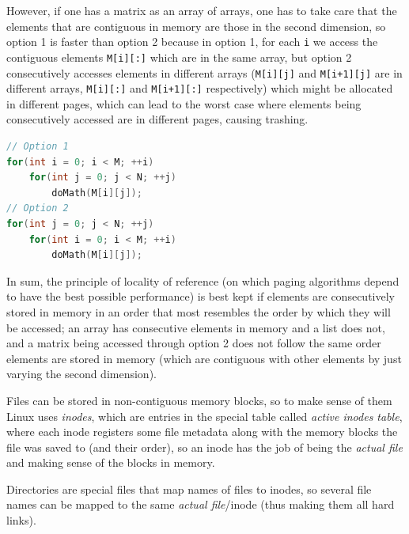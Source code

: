 \documentclass{sope}
\begin{document}
However, if one has a matrix as an array of arrays, one has to take care that the elements that are contiguous in memory are those in the second dimension, so option 1 is faster than option 2 because in option 1, for each \texttt{i} we access the contiguous elements \texttt{M[i][:]} which are in the same array, but option 2 consecutively accesses elements in different arrays (\texttt{M[i][j]} and \texttt{M[i+1][j]} are in different arrays, \texttt{M[i][:]} and \texttt{M[i+1][:]} respectively) which might be allocated in different pages, which can lead to the worst case where elements being consecutively accessed are in different pages, causing trashing.

\begin{lstlisting}[language=C]
// Option 1
for(int i = 0; i < M; ++i)
    for(int j = 0; j < N; ++j)
        doMath(M[i][j]);
// Option 2
for(int j = 0; j < N; ++j)
    for(int i = 0; i < M; ++i)
        doMath(M[i][j]);
\end{lstlisting}

In sum, the principle of locality of reference (on which paging algorithms depend to have the best possible performance) is best kept if elements are consecutively stored in memory in an order that most resembles the order by which they will be accessed; an array has consecutive elements in memory and a list does not, and a matrix being accessed through option 2 does not follow the same order elements are stored in memory (which are contiguous with other elements by just varying the second dimension).

Files can be stored in non-contiguous memory blocks, so to make sense of them Linux uses \emph{inodes}, which are entries in the special table called \emph{active inodes table}, where each inode registers some file metadata along with the memory blocks the file was saved to (and their order), so an inode has the job of being the \emph{actual file} and making sense of the blocks in memory.

Directories are special files that map names of files to inodes, so several file names can be mapped to the same \emph{actual file}/inode (thus making them all hard links).

\newpage
{}




\newpage
{}

\end{document}

